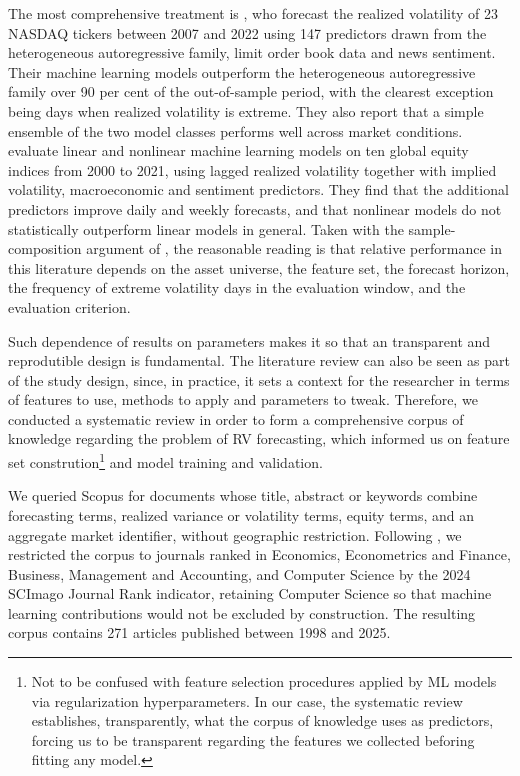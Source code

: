 \documentclass[preprint,12pt,authoryear]{elsarticle}
\begin{document}
The most comprehensive treatment is \citet{rahimikiapoon2026}, who forecast the realized volatility of 23 NASDAQ tickers between 2007 and 2022 using 147 predictors drawn from the heterogeneous autoregressive family, limit order book data and news sentiment. Their machine learning models outperform the heterogeneous autoregressive family over 90 per cent of the out-of-sample period, with the clearest exception being days when realized volatility is extreme. They also report that a simple ensemble of the two model classes performs well across market conditions.
 \citet{brancorubesamzevallos2024} evaluate linear and nonlinear machine learning models on ten global equity indices from 2000 to 2021, using lagged realized volatility together with implied volatility, macroeconomic and sentiment predictors. They find that the additional predictors improve daily and weekly forecasts, and that nonlinear models do not statistically outperform linear models in general. Taken with the sample-composition argument of \citet{rahimikiapoon2026}, the reasonable reading is that relative performance in this literature depends on the asset universe, the feature set, the forecast horizon, the frequency of extreme volatility days in the evaluation window, and the evaluation criterion.

Such dependence of results on parameters makes it so that an transparent and reprodutible design is fundamental. The literature review can also be seen as part of the study design, since, in practice, it sets a context for the researcher in terms of features to use, methods to apply and parameters to tweak. Therefore, we conducted a systematic review in order to form a comprehensive corpus of knowledge regarding the problem of RV forecasting, which informed us on feature set constrution\footnote{Not to be confused with feature selection procedures applied by ML models via regularization hyperparameters. In our case, the systematic review establishes, transparently, what the corpus of knowledge uses as predictors, forcing us to be transparent regarding the features we collected beforing fitting any model.} and model training and validation.

We queried Scopus for documents whose title, abstract or keywords combine forecasting terms, realized variance or volatility terms, equity terms, and an aggregate market identifier, without geographic restriction. Following \citet{harveyliuzhu2016}, we restricted the corpus to journals ranked in Economics, Econometrics and Finance, Business, Management and Accounting, and Computer Science by the 2024 SCImago Journal Rank indicator, retaining Computer Science so that machine learning contributions would not be excluded by construction. The resulting corpus contains 271 articles published between 1998 and 2025.  
\end{document}
